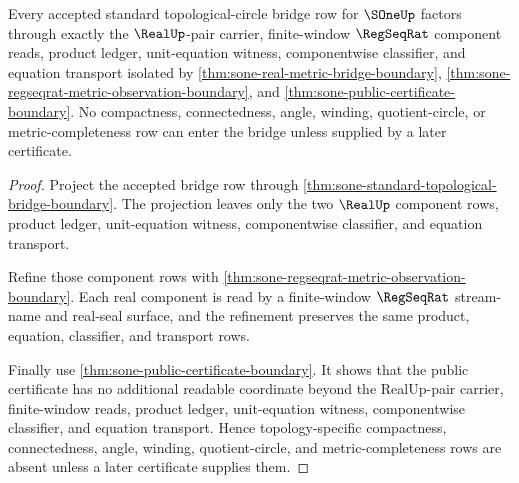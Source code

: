 \begin{theorem}
\label{thm:sone-standard-topological-circle-acceptance-factorization}
Every accepted standard topological-circle bridge row for $\SOneUp$ factors
through exactly the $\RealUp$-pair carrier, finite-window $\RegSeqRat$
component reads, product ledger, unit-equation witness, componentwise
classifier, and equation transport isolated by
\autoref{thm:sone-real-metric-bridge-boundary},
\autoref{thm:sone-regseqrat-metric-observation-boundary}, and
\autoref{thm:sone-public-certificate-boundary}. No compactness, connectedness,
angle, winding, quotient-circle, or metric-completeness row can enter the
bridge unless supplied by a later certificate.
\end{theorem}
\begin{proof}
Project the accepted bridge row through
\autoref{thm:sone-standard-topological-bridge-boundary}. The projection leaves
only the two $\RealUp$ component rows, product ledger, unit-equation witness,
componentwise classifier, and equation transport.

Refine those component rows with
\autoref{thm:sone-regseqrat-metric-observation-boundary}. Each real component
is read by a finite-window $\RegSeqRat$ stream-name and real-seal surface, and
the refinement preserves the same product, equation, classifier, and transport
rows.

Finally use \autoref{thm:sone-public-certificate-boundary}. It shows that the
public certificate has no additional readable coordinate beyond the RealUp-pair
carrier, finite-window reads, product ledger, unit-equation witness,
componentwise classifier, and equation transport. Hence topology-specific
compactness, connectedness, angle, winding, quotient-circle, and
metric-completeness rows are absent unless a later certificate supplies them.
\end{proof}

